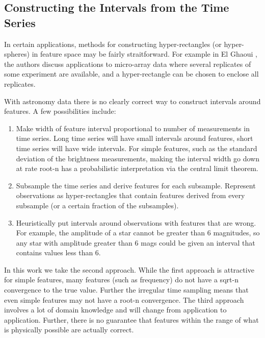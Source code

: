 \documentclass[10pt]{article}
\theoremstyle{definition}
\begin{document}
\subsection{Constructing the Intervals from the Time Series}
In certain applications, methods for constructing hyper-rectangles (or hyper-spheres) in feature space may be fairly straitforward. For example in El Ghaoui \cite{el2003robust}, the authors discuss applications to micro-array data where several replicates of some experiment are available, and a hyper-rectangle can be chosen to enclose all replicates.

With astronomy data there is no clearly correct way to construct intervals around features. A few possibilities include:
\begin{enumerate}
\item Make width of feature interval proportional to number of measurements in time series. Long time series will have small intervals around features, short time series will have wide intervals. For simple features, such as the standard deviation of the brightness measurements, making the interval width go down at rate root-n has a probabilistic interpretation via the central limit theorem.
\item Subsample the time series and derive features for each subsample. Represent observations as hyper-rectangles that contain features derived from every subsample (or a certain fraction of the subsamples).
\item Heuristically put intervals around observations with features that are wrong. For example, the amplitude of a star cannot be greater than 6 magnitudes, so any star with amplitude greater than 6 mags could be given an interval that contains values less than 6.
\end{enumerate}
In this work we take the second approach. While the first approach is attractive for simple features, many features (such as frequency) do not have a sqrt-n convergence to the true value. Further the irregular time sampling means that even simple features may not have a root-n convergence. The third approach involves a lot of domain knowledge and will change from application to application. Further, there is no guarantee that features within the range of what is physically possible are actually correct.
\end{document}
